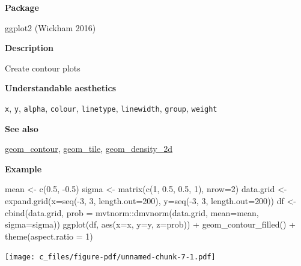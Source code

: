 \documentclass[
  letterpaper,
  DIV=11,
  numbers=noendperiod]{scrreprt}
\newenvironment{Shaded}{\begin{snugshade}}{\end{snugshade}}
\newcommand{\AttributeTok}[1]{\textcolor[rgb]{0.40,0.45,0.13}{#1}}
\newcommand{\DecValTok}[1]{\textcolor[rgb]{0.68,0.00,0.00}{#1}}
\newcommand{\FloatTok}[1]{\textcolor[rgb]{0.68,0.00,0.00}{#1}}
\newcommand{\FunctionTok}[1]{\textcolor[rgb]{0.28,0.35,0.67}{#1}}
\newcommand{\NormalTok}[1]{\textcolor[rgb]{0.00,0.23,0.31}{#1}}
\newcommand{\OtherTok}[1]{\textcolor[rgb]{0.00,0.23,0.31}{#1}}
\newcommand{\SpecialCharTok}[1]{\textcolor[rgb]{0.37,0.37,0.37}{#1}}
\begin{document}
\textbf{Package}

ggplot2 (Wickham 2016)

\textbf{Description}

Create contour plots

\textbf{Understandable aesthetics}

\texttt{x}, \texttt{y}, \texttt{alpha}, \texttt{colour},
\texttt{linetype}, \texttt{linewidth}, \texttt{group}, \texttt{weight}

\textbf{See also}

\hyperref[contour]{geom\_contour}, \hyperref[tile]{geom\_tile},
\hyperref[density_2d]{geom\_density\_2d}

\textbf{Example}

\begin{Shaded}
\begin{Highlighting}[]
\NormalTok{mean }\OtherTok{\textless{}{-}} \FunctionTok{c}\NormalTok{(}\FloatTok{0.5}\NormalTok{, }\SpecialCharTok{{-}}\FloatTok{0.5}\NormalTok{)}
\NormalTok{sigma }\OtherTok{\textless{}{-}} \FunctionTok{matrix}\NormalTok{(}\FunctionTok{c}\NormalTok{(}\DecValTok{1}\NormalTok{, }\FloatTok{0.5}\NormalTok{, }\FloatTok{0.5}\NormalTok{, }\DecValTok{1}\NormalTok{), }\AttributeTok{nrow=}\DecValTok{2}\NormalTok{)}
\NormalTok{data.grid }\OtherTok{\textless{}{-}} \FunctionTok{expand.grid}\NormalTok{(}\AttributeTok{x=}\FunctionTok{seq}\NormalTok{(}\SpecialCharTok{{-}}\DecValTok{3}\NormalTok{, }\DecValTok{3}\NormalTok{, }\AttributeTok{length.out=}\DecValTok{200}\NormalTok{),}
                         \AttributeTok{y=}\FunctionTok{seq}\NormalTok{(}\SpecialCharTok{{-}}\DecValTok{3}\NormalTok{, }\DecValTok{3}\NormalTok{, }\AttributeTok{length.out=}\DecValTok{200}\NormalTok{))}
\NormalTok{df }\OtherTok{\textless{}{-}} \FunctionTok{cbind}\NormalTok{(data.grid, }\AttributeTok{prob =}\NormalTok{ mvtnorm}\SpecialCharTok{::}\FunctionTok{dmvnorm}\NormalTok{(data.grid, }\AttributeTok{mean=}\NormalTok{mean, }\AttributeTok{sigma=}\NormalTok{sigma))}
\FunctionTok{ggplot}\NormalTok{(df, }\FunctionTok{aes}\NormalTok{(}\AttributeTok{x=}\NormalTok{x, }\AttributeTok{y=}\NormalTok{y, }\AttributeTok{z=}\NormalTok{prob)) }\SpecialCharTok{+} 
  \FunctionTok{geom\_contour\_filled}\NormalTok{() }\SpecialCharTok{+} 
  \FunctionTok{theme}\NormalTok{(}\AttributeTok{aspect.ratio =} \DecValTok{1}\NormalTok{)}
\end{Highlighting}
\end{Shaded}

\texttt{[image: c\_files/figure-pdf/unnamed-chunk-7-1.pdf]}
\end{document}
